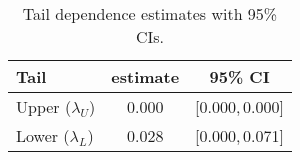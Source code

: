 \begin{table}[t]
  \centering
  \small
  \caption{Tail dependence estimates with 95\% CIs.}
  \label{tab:tail-dep}
  \begin{tabular}{lcc}
    \toprule
    Tail & estimate & 95\% CI \\
    \midrule
    Upper ($\lambda_U$) & 0.000 & [0.000,\,0.000] \\
    Lower ($\lambda_L$) & 0.028 & [0.000,\,0.071] \\
    \bottomrule
  \end{tabular}
\end{table}

